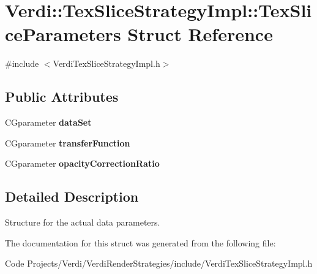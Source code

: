 \hypertarget{struct_verdi_1_1_tex_slice_strategy_impl_1_1_tex_slice_parameters}{\section{\-Verdi\-:\-:\-Tex\-Slice\-Strategy\-Impl\-:\-:\-Tex\-Slice\-Parameters \-Struct \-Reference}
\label{struct_verdi_1_1_tex_slice_strategy_impl_1_1_tex_slice_parameters}
}


{\ttfamily \#include $<$\-Verdi\-Tex\-Slice\-Strategy\-Impl.\-h$>$}

\subsection*{\-Public \-Attributes}
\begin{DoxyCompactItemize}
\item 
\hypertarget{struct_verdi_1_1_tex_slice_strategy_impl_1_1_tex_slice_parameters_a6c3627c0820bb651660639623c93e4a6}{\-C\-Gparameter {\bfseries data\-Set}}\label{struct_verdi_1_1_tex_slice_strategy_impl_1_1_tex_slice_parameters_a6c3627c0820bb651660639623c93e4a6}

\item 
\hypertarget{struct_verdi_1_1_tex_slice_strategy_impl_1_1_tex_slice_parameters_a41e024a0193a6f04edfc56c09238bd33}{\-C\-Gparameter {\bfseries transfer\-Function}}\label{struct_verdi_1_1_tex_slice_strategy_impl_1_1_tex_slice_parameters_a41e024a0193a6f04edfc56c09238bd33}

\item 
\hypertarget{struct_verdi_1_1_tex_slice_strategy_impl_1_1_tex_slice_parameters_a70613e5fc7b8f77faa793a413358d849}{\-C\-Gparameter {\bfseries opacity\-Correction\-Ratio}}\label{struct_verdi_1_1_tex_slice_strategy_impl_1_1_tex_slice_parameters_a70613e5fc7b8f77faa793a413358d849}

\end{DoxyCompactItemize}


\subsection{\-Detailed \-Description}
\-Structure for the actual data parameters. 

\-The documentation for this struct was generated from the following file\-:\begin{DoxyCompactItemize}
\item 
\-Code Projects/\-Verdi/\-Verdi\-Render\-Strategies/include/\-Verdi\-Tex\-Slice\-Strategy\-Impl.\-h\end{DoxyCompactItemize}

